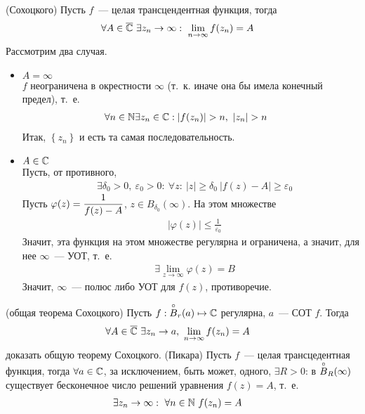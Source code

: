 \theorem (Сохоцкого)
Пусть $f$~--- целая трансцендентная функция, тогда
\begin{align*}
  & \forall A \in \overline{\mathbb{C}} \ \exists z_n \to \infty: \ \lim_{n \to \infty}f(z_n) = A
\end{align*}
\pr
Рассмотрим два случая.
\begin{itemize}
    \item $A = \infty$
    \\
    $f$ неограничена в окрестности $\infty$ (т.~к. иначе она бы имела конечный
    предел), т.~е.
    \begin{align*}
      & \forall n \in \NN \exists z_n \in \CC: \left| f(z_n) \right|> n, \ \left| z_n \right| > n
    \end{align*}
    Итак, $\left\{ z_n \right\}$ и есть та самая последовательность.
    \item $A \in \mathbb{C}$
    \\
    Пусть, от противного,
    \begin{align*}
      & \exists \delta_0 > 0, \ \varepsilon_0 > 0: \ \forall z: \ \left| z \right| \geq \delta_0 \ \left| f(z) - A \right| \geq \varepsilon_0
    \end{align*}
    Пусть $\varphi(z) = \displaystyle \frac{1}{f(z) - A}$, $z \in B_{\delta_0}(\infty)$.
    На этом множестве
    \begin{align*}
      & \left| \varphi(z) \right| \leq \frac{1}{\varepsilon_0}
    \end{align*}
    Значит, эта функция на этом множестве регулярна и ограничена, а значит, для
    нее $\infty$~--- УОТ, т.~е.
    \begin{align*}
      & \exists \lim_{z \to \infty}\varphi(z) = B
    \end{align*}
    Значит, $\infty$~--- полюс либо УОТ для $f(z)$, противоречие.
\end{itemize}
\theorem (общая теорема Сохоцкого)
Пусть $f: \overset{\circ}{B}_r(a) \mapsto \mathbb{C}$ регулярна, $a$~--- СОТ $f$. Тогда
\begin{align*}
  & \forall A \in \overline{\mathbb{C}} \ \exists z_n \to a, \ \lim_{n \to \infty} f(z_n) = A
\end{align*}
\Exse
доказать общую теорему Сохоцкого.
\theorem (Пикара)
Пусть $f$~--- целая трансцедентная функция, тогда $\forall a \in \mathbb{C}$, за
исключением, быть может, одного, $\exists R > 0$: в $\overset{\circ}{B}_R(\infty)$
существует бесконечное число решений уравнения $f(z) = A$, т.~е.
\begin{align*}
  & \exists z_n \to \infty: \ \forall n \in \mathbb{N} \ f(z_n) = A
\end{align*}
